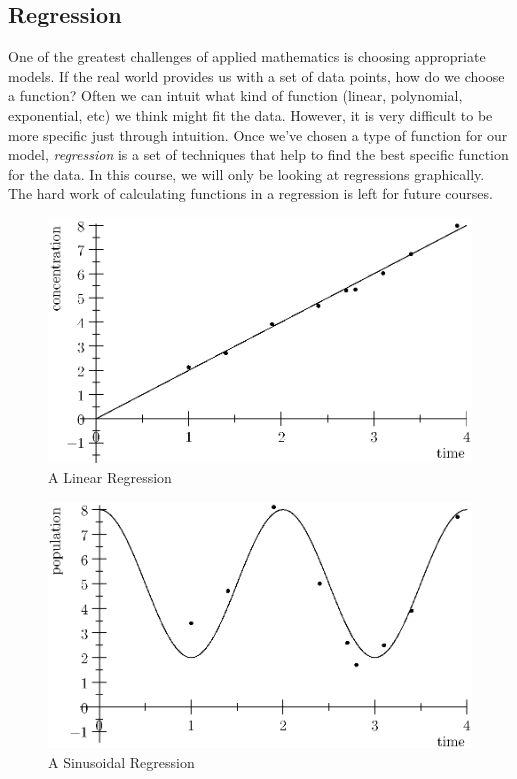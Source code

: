\documentclass[fleqn]{report}
\begin{document}
\subsection{Regression}
\label{regression}

One of the greatest challenges of applied mathematics is
choosing appropriate models. If the real world provides us
with a set of data points, how do we choose a function?
Often we can intuit what kind of function (linear, polynomial,
exponential, etc) we think might fit the data. However, it is
very difficult to be more specific just through intuition.
Once we've chosen a type of function for our model,
\emph{regression} is a set of techniques that help to find the
best specific function for the data.  In this course, we will
only be looking at regressions graphically. The hard work of
calculating functions in a regression is left for future
courses. 

\begin{figure}[ht]
\centering
\includegraphics[width=12cm]{figure37.eps}
\caption{A Linear Regression}
\label{figure-linear-regression}
\end{figure}

\begin{figure}[ht]
\centering
\includegraphics[width=12cm]{figure38.eps}
\caption{A Sinusoidal Regression}
\label{figure-sinusoidal-regression}
\end{figure}
\end{document}
